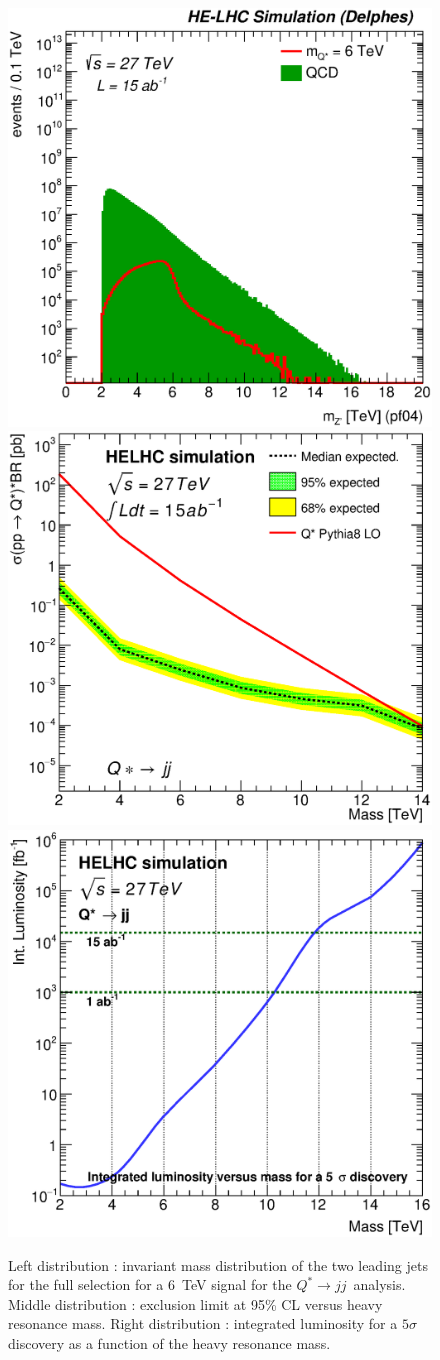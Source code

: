 \documentclass{cernrep}
\newcommand*{\qjj}{\ensuremath{Q^{*} \rightarrow jj}}
\begin{document}
\begin{figure}
  \centering
  \includegraphics[width=0.30\columnwidth]{Fig/27tev/qq_Mj1j2_pf04_sel1_nostack_log.eps}
  \includegraphics[width=0.30\columnwidth]{Fig/27tev/lim_Qstar_jj_helhc_v01.eps}
  \includegraphics[width=0.30\columnwidth]{Fig/27tev/DiscoveryPotential_jj_rootStyle.eps}
  \caption{Left distribution : invariant mass distribution of the two leading jets for the full selection for a 6~TeV signal for the \qjj\ analysis. Middle distribution : exclusion limit at 95\% CL versus heavy resonance mass. Right distribution : integrated luminosity for a $5\sigma$ discovery as a function of the heavy resonance mass.}
  \label{figure:hadronicresonances27:qqsel01}
\end{figure}

\begin{table}[!htb]\centering
{}
\caption{Final yield of analysis.}
\label{tab:qqYield27}
\end{table}
\end{document}
